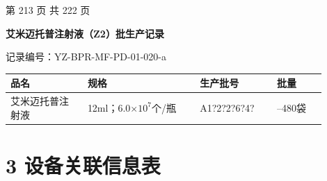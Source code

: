 \documentclass[UTF8,10pt,a4paper,fontset=fandol]{ctexart}
\newcommand{\fieldvalue}[1]{#1}
\newcommand{\handwritten}[1]{#1}
\begin{document}
\vfill

\begin{center}
第 213 页 共 222 页
\end{center}

\newpage

\begin{center}
\textbf{艾米迈托普注射液（Z2）批生产记录}
\end{center}

\noindent
记录编号：YZ-BPR-MF-PD-01-020-a

\begin{center}
\begin{tabular}{|p{0.22\linewidth}|p{0.32\linewidth}|p{0.22\linewidth}|p{0.14\linewidth}|}
\hline
\centering 品名 & \centering 规格 & \centering 生产批号 & \centering 批量 \tabularnewline
\hline
\centering 艾米迈托普注射液 &
\centering 12ml；6.0$\times 10^{7}$个/瓶 &
\fieldvalue{\handwritten{A1?2?2?6?4?}} &
\centering 200--480袋 \tabularnewline
\hline
\end{tabular}
\end{center}

\section*{3 设备关联信息表}
\end{document}
